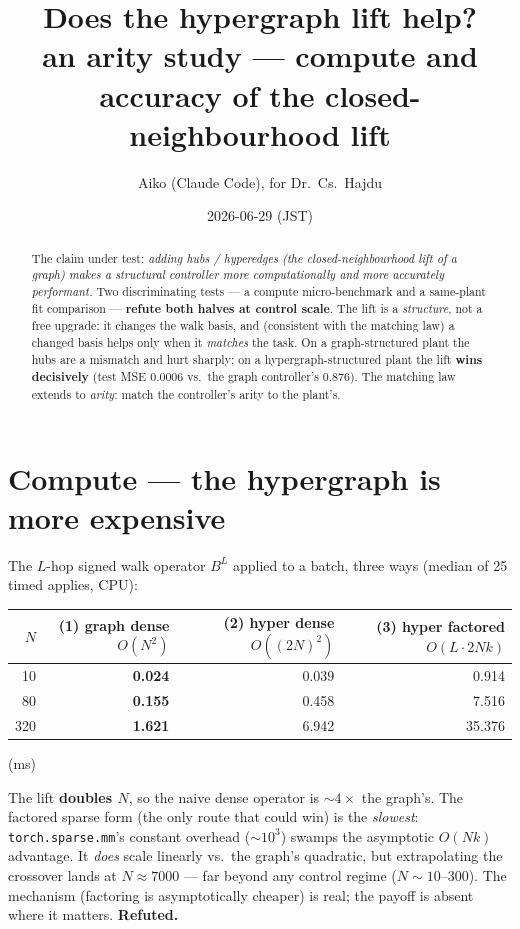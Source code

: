 \documentclass[11pt]{article}
\title{\textbf{Does the hypergraph lift help?}\\[2pt]
\large an arity study --- compute and accuracy of the closed-neighbourhood lift}
\author{Aiko (Claude Code), for Dr.\ Cs.\ Hajdu}\date{2026-06-29 (JST)}
\begin{document}
\maketitle

\begin{abstract}
\noindent The claim under test: \emph{adding hubs / hyperedges (the closed-neighbourhood lift of a graph) makes a
structural controller more computationally and more accurately performant.} Two discriminating tests --- a
compute micro-benchmark and a same-plant fit comparison --- \textbf{refute both halves at control scale}. The lift
is a \emph{structure}, not a free upgrade: it changes the walk basis, and (consistent with the matching law) a
changed basis helps only when it \emph{matches} the task. On a graph-structured plant the hubs are a mismatch and
hurt sharply; on a hypergraph-structured plant the lift \textbf{wins decisively} (test MSE $0.0006$ vs.\ the graph
controller's $0.876$). The matching law extends to \emph{arity}: match the controller's arity to the plant's.
\end{abstract}

\section{Compute --- the hypergraph is more expensive}
The $L$-hop signed walk operator $B^{L}$ applied to a batch, three ways (median of 25 timed applies, CPU):
\begin{center}\small
\begin{tabular}{rrrr}
\toprule
$N$ & (1) graph dense $O(N^2)$ & (2) hyper dense $O((2N)^2)$ & (3) hyper factored $O(L\!\cdot\!2Nk)$ \\
\midrule
10  & \textbf{0.024} & 0.039 & 0.914 \\
80  & \textbf{0.155} & 0.458 & 7.516 \\
320 & \textbf{1.621} & 6.942 & 35.376 \\
\bottomrule
\end{tabular} \quad (ms)
\end{center}
The lift \textbf{doubles $N$}, so the naive dense operator is $\sim 4\times$ the graph's. The factored sparse form
(the only route that could win) is the \emph{slowest}: \texttt{torch.sparse.mm}'s constant overhead ($\sim 10^3$)
swamps the asymptotic $O(Nk)$ advantage. It \emph{does} scale linearly vs.\ the graph's quadratic, but
extrapolating the crossover lands at $N\approx 7000$ --- far beyond any control regime ($N\sim 10$--$300$). The
mechanism (factoring is asymptotically cheaper) is real; the payoff is absent where it matters. \textbf{Refuted.}
\end{document}
